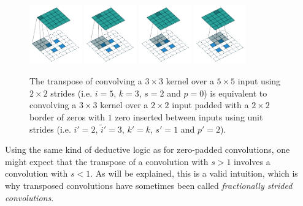 \documentclass{article}
\begin{document}
\begin{figure}[h]
    \centering
    \includegraphics[width=0.2\textwidth]
        {pdf/no_padding_strides_transposed_00.pdf}
    \includegraphics[width=0.2\textwidth]
        {pdf/no_padding_strides_transposed_01.pdf}
    \includegraphics[width=0.2\textwidth]
        {pdf/no_padding_strides_transposed_02.pdf}
    \includegraphics[width=0.2\textwidth]
        {pdf/no_padding_strides_transposed_03.pdf}
    \caption{\label{fig:no_padding_strides_transposed} The transpose of
        convolving a $3 \times 3$ kernel over a $5 \times 5$ input using $2
        \times 2$ strides (i.e. $i = 5$, $k = 3$, $s = 2$ and $p = 0$) is
        equivalent to convolving a $3 \times 3$ kernel over a $2 \times 2$ input
        padded with a $2 \times 2$ border of zeros with $1$ zero inserted
        between inputs using unit strides (i.e. $i' = 2$, $\tilde{i}' = 3$, $k'
        = k$, $s' = 1$ and $p' = 2$).}
\end{figure}

Using the same kind of deductive logic as for zero-padded convolutions, one
might expect that the transpose of a convolution with $s > 1$ involves a
convolution with $s < 1$. As will be explained, this is a valid intuition, which
is why transposed convolutions have sometimes been called {\em fractionally
strided convolutions}.
\end{document}
